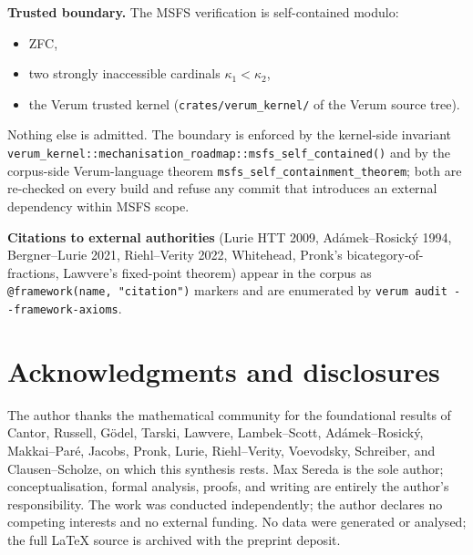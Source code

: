\documentclass[11pt]{article}
\theoremstyle{plain}
\theoremstyle{definition}
\begin{document}
\medskip

\noindent\textbf{Trusted boundary.}  The MSFS verification is
self-contained modulo:
\begin{itemize}
\item ZFC,
\item two strongly inaccessible cardinals $\kappa_1 < \kappa_2$,
\item the Verum trusted kernel (\texttt{crates/verum\_kernel/} of the
      Verum source tree).
\end{itemize}
Nothing else is admitted.  The boundary is enforced by the
kernel-side invariant
\texttt{verum\_kernel::mechanisation\_roadmap::msfs\_self\_contained()}
and by the corpus-side Verum-language theorem
\texttt{msfs\_self\_containment\_theorem}; both are re-checked on every
build and refuse any commit that introduces an external dependency
within MSFS scope.

\medskip

\noindent\textbf{Citations to external authorities} (Lurie HTT 2009,
Ad\'amek--Rosick\'y 1994, Bergner--Lurie 2021, Riehl--Verity 2022,
Whitehead, Pronk's bicategory-of-fractions, Lawvere's fixed-point
theorem) appear in the corpus as
\texttt{@framework(name, "citation")} markers and are enumerated by
\texttt{verum audit -\!-framework-axioms}.


\section*{Acknowledgments and disclosures}

The author thanks the mathematical community for the foundational results of Cantor, Russell, G\"odel, Tarski, Lawvere, Lambek--Scott, Ad\'amek--Rosick\'y, Makkai--Par\'e, Jacobs, Pronk, Lurie, Riehl--Verity, Voevodsky, Schreiber, and Clausen--Scholze, on which this synthesis rests. Max Sereda is the sole author; conceptualisation, formal analysis, proofs, and writing are entirely the author's responsibility. The work was conducted independently; the author declares no competing interests and no external funding. No data were generated or analysed; the full LaTeX source is archived with the preprint deposit.
\end{document}
